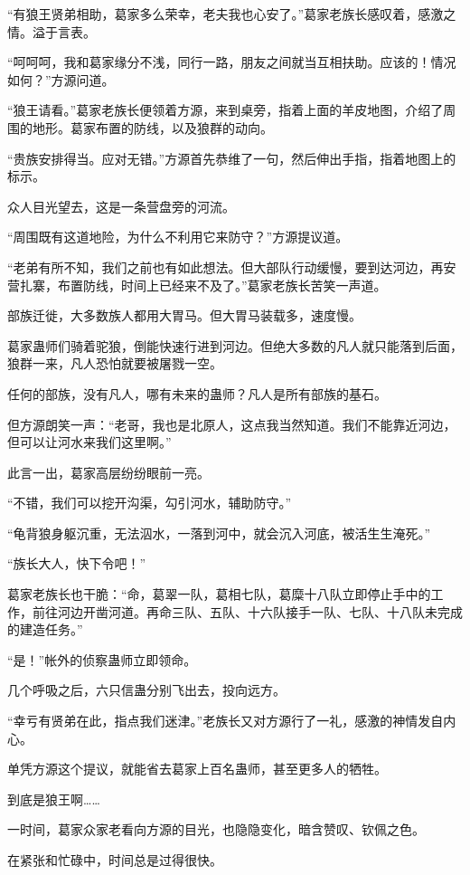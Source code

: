 \begin{this_body}
“有狼王贤弟相助，葛家多么荣幸，老夫我也心安了。”葛家老族长感叹着，感激之情。溢于言表。

“呵呵呵，我和葛家缘分不浅，同行一路，朋友之间就当互相扶助。应该的！情况如何？”方源问道。

“狼王请看。”葛家老族长便领着方源，来到桌旁，指着上面的羊皮地图，介绍了周围的地形。葛家布置的防线，以及狼群的动向。

“贵族安排得当。应对无错。”方源首先恭维了一句，然后伸出手指，指着地图上的标示。

众人目光望去，这是一条营盘旁的河流。

“周围既有这道地险，为什么不利用它来防守？”方源提议道。

“老弟有所不知，我们之前也有如此想法。但大部队行动缓慢，要到达河边，再安营扎寨，布置防线，时间上已经来不及了。”葛家老族长苦笑一声道。

部族迁徙，大多数族人都用大胃马。但大胃马装载多，速度慢。

葛家蛊师们骑着驼狼，倒能快速行进到河边。但绝大多数的凡人就只能落到后面，狼群一来，凡人恐怕就要被屠戮一空。

任何的部族，没有凡人，哪有未来的蛊师？凡人是所有部族的基石。

但方源朗笑一声：“老哥，我也是北原人，这点我当然知道。我们不能靠近河边，但可以让河水来我们这里啊。”

此言一出，葛家高层纷纷眼前一亮。

“不错，我们可以挖开沟渠，勾引河水，辅助防守。”

“龟背狼身躯沉重，无法泅水，一落到河中，就会沉入河底，被活生生淹死。”

“族长大人，快下令吧！”

葛家老族长也干脆：“命，葛翠一队，葛相七队，葛糜十八队立即停止手中的工作，前往河边开凿河道。再命三队、五队、十六队接手一队、七队、十八队未完成的建造任务。”

“是！”帐外的侦察蛊师立即领命。

几个呼吸之后，六只信蛊分别飞出去，投向远方。

“幸亏有贤弟在此，指点我们迷津。”老族长又对方源行了一礼，感激的神情发自内心。

单凭方源这个提议，就能省去葛家上百名蛊师，甚至更多人的牺牲。

到底是狼王啊……

一时间，葛家众家老看向方源的目光，也隐隐变化，暗含赞叹、钦佩之色。

在紧张和忙碌中，时间总是过得很快。


\end{this_body}
